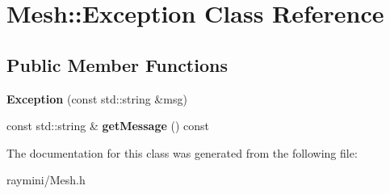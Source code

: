 \hypertarget{class_mesh_1_1_exception}{
\section{Mesh::Exception Class Reference}
\label{class_mesh_1_1_exception}
}
\subsection*{Public Member Functions}
\begin{DoxyCompactItemize}
\item 
\hypertarget{class_mesh_1_1_exception_aca0704da9d071bb4d946d0056f454832}{
{\bfseries Exception} (const std::string \&msg)}
\label{class_mesh_1_1_exception_aca0704da9d071bb4d946d0056f454832}

\item 
\hypertarget{class_mesh_1_1_exception_a739346738adb332d436e4cd02a710cc9}{
const std::string \& {\bfseries getMessage} () const }
\label{class_mesh_1_1_exception_a739346738adb332d436e4cd02a710cc9}

\end{DoxyCompactItemize}


The documentation for this class was generated from the following file:\begin{DoxyCompactItemize}
\item 
raymini/Mesh.h\end{DoxyCompactItemize}
